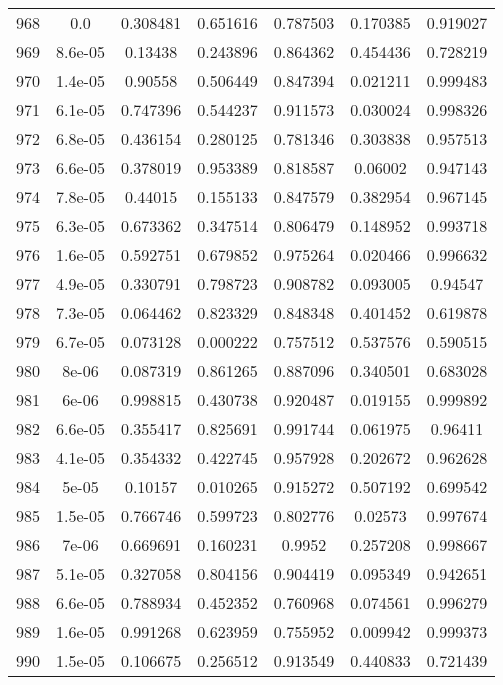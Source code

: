 \begin{table}
\begin{tabular}{c|c|c|c|c|c|c}
968 & 0.0 & 0.308481 & 0.651616 & 0.787503 & 0.170385 & 0.919027\\
969 & 8.6e-05 & 0.13438 & 0.243896 & 0.864362 & 0.454436 & 0.728219\\
970 & 1.4e-05 & 0.90558 & 0.506449 & 0.847394 & 0.021211 & 0.999483\\
971 & 6.1e-05 & 0.747396 & 0.544237 & 0.911573 & 0.030024 & 0.998326\\
972 & 6.8e-05 & 0.436154 & 0.280125 & 0.781346 & 0.303838 & 0.957513\\
973 & 6.6e-05 & 0.378019 & 0.953389 & 0.818587 & 0.06002 & 0.947143\\
974 & 7.8e-05 & 0.44015 & 0.155133 & 0.847579 & 0.382954 & 0.967145\\
975 & 6.3e-05 & 0.673362 & 0.347514 & 0.806479 & 0.148952 & 0.993718\\
976 & 1.6e-05 & 0.592751 & 0.679852 & 0.975264 & 0.020466 & 0.996632\\
977 & 4.9e-05 & 0.330791 & 0.798723 & 0.908782 & 0.093005 & 0.94547\\
978 & 7.3e-05 & 0.064462 & 0.823329 & 0.848348 & 0.401452 & 0.619878\\
979 & 6.7e-05 & 0.073128 & 0.000222 & 0.757512 & 0.537576 & 0.590515\\
980 & 8e-06 & 0.087319 & 0.861265 & 0.887096 & 0.340501 & 0.683028\\
981 & 6e-06 & 0.998815 & 0.430738 & 0.920487 & 0.019155 & 0.999892\\
982 & 6.6e-05 & 0.355417 & 0.825691 & 0.991744 & 0.061975 & 0.96411\\
983 & 4.1e-05 & 0.354332 & 0.422745 & 0.957928 & 0.202672 & 0.962628\\
984 & 5e-05 & 0.10157 & 0.010265 & 0.915272 & 0.507192 & 0.699542\\
985 & 1.5e-05 & 0.766746 & 0.599723 & 0.802776 & 0.02573 & 0.997674\\
986 & 7e-06 & 0.669691 & 0.160231 & 0.9952 & 0.257208 & 0.998667\\
987 & 5.1e-05 & 0.327058 & 0.804156 & 0.904419 & 0.095349 & 0.942651\\
988 & 6.6e-05 & 0.788934 & 0.452352 & 0.760968 & 0.074561 & 0.996279\\
989 & 1.6e-05 & 0.991268 & 0.623959 & 0.755952 & 0.009942 & 0.999373\\
990 & 1.5e-05 & 0.106675 & 0.256512 & 0.913549 & 0.440833 & 0.721439\\
\end{tabular}
\end{table}
